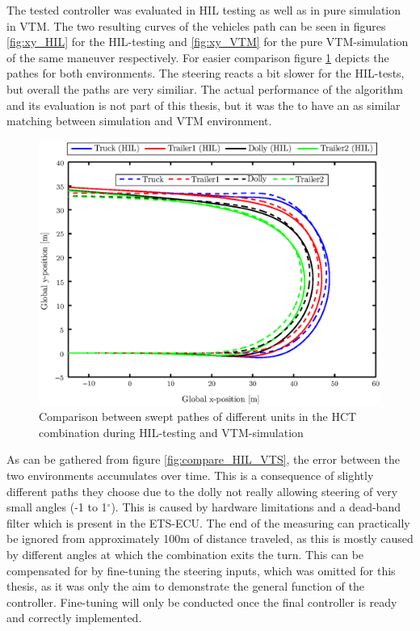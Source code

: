\documentclass[ExampleMasters.tex]{subfiles}
\begin{document}
The tested controller was evaluated in \gls{HIL} testing as well as in pure simulation in \gls{VTM}. The two resulting curves of the vehicles path can be seen in figures \ref{fig:xy_HIL} for the \gls{HIL}-testing and \ref{fig:xy_VTM} for the pure \gls{VTM}-simulation of the same maneuver respectively. For easier comparison figure \ref{fig:xy_HIL_and_VTM} depicts the pathes for both environments. The steering reacts a bit slower for the \gls{HIL}-tests, but overall the paths are very similiar. The actual performance of the algorithm and its evaluation is not part of this thesis, but it was the to have an as similar matching between simulation and \gls{VTM} environment.


\begin{figure}[!htb]
	\centering
	\includegraphics[width=1\linewidth]{figures/xy_HIL_and_VTM}
	\caption{Comparison between swept pathes of different units in the \gls{HCT} combination during \gls{HIL}-testing and \gls{VTM}-simulation}
	
	\label{fig:xy_HIL_and_VTM}
\end{figure}

As can be gathered from figure \ref{fig:compare_HIL_VTS}, the error between the two environments accumulates over time. This is a consequence of slightly different paths they choose due to the dolly not really allowing steering of very small angles (-1 to 1$^\circ$). This is caused by hardware limitations and a dead-band filter which is present in the \gls{ETS}-\gls{ECU}. The end of the measuring can practically be ignored from approximately 100m of distance traveled, as this is mostly caused by different angles at which the combination exits the turn. This can be compensated for by fine-tuning the steering inputs, which was omitted for this thesis, as it was only the aim to demonstrate the general function of the controller. Fine-tuning will only be conducted once the final controller is ready and correctly implemented. 
\end{document}
